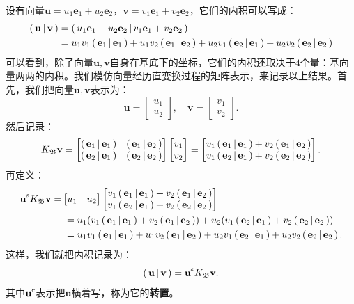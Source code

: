 \documentclass[12pt,UTF8]{ctexbook}
\begin{document}
设有向量$\mathbf{u} = u_1\mathbf{e}_1 + u_2\mathbf{e}_2$，$\mathbf{v} = v_1\mathbf{e}_1 + v_2\mathbf{e}_2$，它们的内积可以写成：
\begin{align*}
    \displaystyle\left( \,\mathbf{u} \,\middle\vert \,\mathbf{v} \,\right) &= \displaystyle\left( \,u_1\mathbf{e}_1 + u_2\mathbf{e}_2 \,\middle\vert \,v_1\mathbf{e}_1 + v_2\mathbf{e}_2 \,\right) \\
    &= u_1v_1 \displaystyle\left( \,\mathbf{e}_1 \,\middle\vert \,\mathbf{e}_1 \,\right) + u_1v_2 \displaystyle\left( \,\mathbf{e}_1 \,\middle\vert \,\mathbf{e}_2 \,\right) + u_2v_1 \displaystyle\left( \,\mathbf{e}_2 \,\middle\vert \,\mathbf{e}_1 \,\right) + u_2v_2 \displaystyle\left( \,\mathbf{e}_2 \,\middle\vert \,\mathbf{e}_2 \,\right) \\
\end{align*}
可以看到，除了向量$\mathbf{u}, \mathbf{v}$自身在基底下的坐标，它们的内积还取决于$4$个量：基向量两两的内积。我们模仿向量经历直变换过程的矩阵表示，来记录以上结果。首先，我们把向量$\mathbf{u}, \mathbf{v}$表示为：
$$ \mathbf{u} = \begin{bmatrix}
    u_1\\ u_2
\end{bmatrix},\quad \mathbf{v} = \begin{bmatrix}
    v_1\\ v_2
\end{bmatrix}. $$
然后记录：
$$ K_{\mathfrak{B}} \mathbf{v} = \begin{bmatrix}
     \displaystyle\left( \,\mathbf{e}_1 \,\middle\vert \,\mathbf{e}_1 \,\right) & \displaystyle\left( \,\mathbf{e}_1 \,\middle\vert \,\mathbf{e}_2 \,\right) \\ \displaystyle\left( \,\mathbf{e}_2 \,\middle\vert \,\mathbf{e}_1 \,\right) & \displaystyle\left( \,\mathbf{e}_2 \,\middle\vert \,\mathbf{e}_2 \,\right)
\end{bmatrix}\begin{bmatrix}
    v_1\\ v_2
\end{bmatrix} = \begin{bmatrix}
    v_1\displaystyle\left( \,\mathbf{e}_1 \,\middle\vert \,\mathbf{e}_1 \,\right) + v_2\displaystyle\left( \,\mathbf{e}_1 \,\middle\vert \,\mathbf{e}_2 \,\right)\\ v_1\displaystyle\left( \,\mathbf{e}_2 \,\middle\vert \,\mathbf{e}_1 \,\right) + v_2\displaystyle\left( \,\mathbf{e}_2 \,\middle\vert \,\mathbf{e}_2 \,\right)
\end{bmatrix}.$$
再定义：
\begin{align*}
    \mathbf{u}^{\tr} K_{\mathfrak{B}} \mathbf{v} =& \begin{bmatrix}
        u_1 & u_2
    \end{bmatrix}\begin{bmatrix}
        v_1\nji{\mathbf{e}_1}{\mathbf{e}_1} + v_2\nji{\mathbf{e}_1}{\mathbf{e}_2}\\ v_1\nji{\mathbf{e}_2}{\mathbf{e}_1} + v_2\nji{\mathbf{e}_2}{\mathbf{e}_2}
    \end{bmatrix} \\
    &\;= u_1 (v_1\nji{\mathbf{e}_1}{\mathbf{e}_1} + v_2\nji{\mathbf{e}_1}{\mathbf{e}_2}) + u_2 (v_1\nji{\mathbf{e}_2}{\mathbf{e}_1} + v_2\nji{\mathbf{e}_2}{\mathbf{e}_2}) \\
    &\;= u_1v_1 \nji{\mathbf{e}_1}{\mathbf{e}_1} + u_1v_2\nji{\mathbf{e}_1}{\mathbf{e}_2} + u_2v_1\nji{\mathbf{e}_2}{\mathbf{e}_1} + u_2v_2\nji{\mathbf{e}_2}{\mathbf{e}_2}.
\end{align*}
这样，我们就把内积记录为：
$$ \nji{\mathbf{u}}{\mathbf{v}} = \mathbf{u}^{\tr} K_{\mathfrak{B}} \mathbf{v}. $$
其中$\mathbf{u}^{\tr}$表示把$\mathbf{u}$横着写，称为它的\textbf{转置}。
\end{document}
